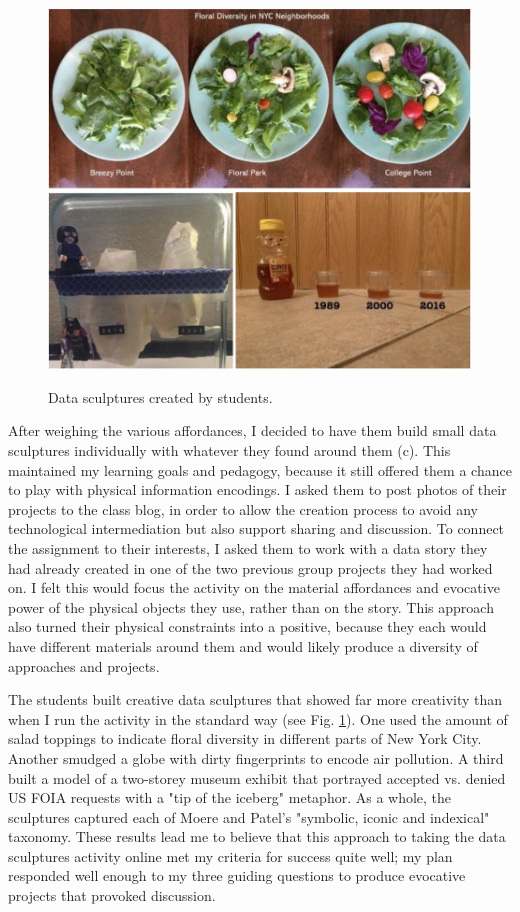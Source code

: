 \documentclass[journal]{vgtc}                %
\begin{document}
\begin{figure}[h]
  \centering
  \includegraphics[scale=0.26]{figures/figure1.jpg}
  \label{fig:data_sculpture_examples}
  \caption{Data sculptures created by students.}
\end{figure}

After weighing the various affordances, I decided to have them build small data sculptures individually with whatever they found around them (c). This maintained my learning goals and pedagogy, because it still offered them a chance to play with physical information encodings. I asked them to post photos of their projects to the class blog, in order to allow the creation process to avoid any technological intermediation but also support sharing and discussion.  To connect the assignment to their interests, I asked them to work with a data story they had already created in one of the two previous group projects they had worked on. I felt this would focus the activity on the material affordances and evocative power of the physical objects they use, rather than on the story. This approach also turned their physical constraints into a positive, because they each would have different materials around them and would likely produce a diversity of approaches and projects.

The students built creative data sculptures that showed far more creativity than when I run the activity in the standard way (see Fig. \ref{fig:data_sculpture_examples}). One used the amount of salad toppings to indicate floral diversity in different parts of New York City. Another smudged a globe with dirty fingerprints to encode air pollution. A third built a model of a two-storey museum exhibit that portrayed accepted vs. denied US FOIA requests with a "tip of the iceberg" metaphor. As a whole, the sculptures captured each of Moere and Patel's "symbolic, iconic and indexical" taxonomy\cite{moere_physical_2009}. These results lead me to believe that this approach to taking the data sculptures activity online met my criteria for success quite well; my plan responded well enough to my three guiding questions to produce evocative projects that provoked discussion.
\end{document}
